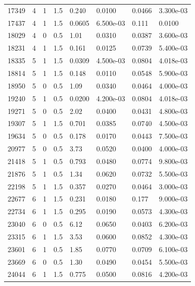 \documentclass[preview]{standalone}
\begin{document}
{{{\begin{tabular}{L{1.2cm}C{1.2cm} C{0.3cm}C{0.5cm} C{1.4cm}C{1.4cm} C{1.4cm}C{1.4cm}}
  17349  &     4  & 1     & 1.5 &  0.240  & 0.0100  & 0.0466 &  3.300e-03   \\ 
  17437  &     4  & 1     & 1.5 &  0.0605  & 6.500e-03  & 0.111 &  0.0100   \\ 
  18029  &     4  & 0     & 0.5 &  1.01  & 0.0310  & 0.0387 &  3.600e-03   \\ 
  18231  &     4  & 1     & 1.5 &  0.161  & 0.0125  & 0.0739 &  5.400e-03   \\ 
  18335  &     5  & 1     & 1.5 &  0.0309  & 4.500e-03  & 0.0804 &  4.018e-03   \\ 
  18814  &     5  & 1     & 1.5 &  0.148  & 0.0110  & 0.0548 &  5.900e-03   \\ 
  18950  &     5  & 0     & 0.5 &  1.09  & 0.0340  & 0.0464 &  4.000e-03   \\ 
  19240  &     5  & 1     & 0.5 &  0.0200  & 4.200e-03  & 0.0804 &  4.018e-03   \\ 
  19271  &     5  & 0     & 0.5 &  2.02  & 0.0400  & 0.0431 &  4.800e-03   \\ 
  19307  &     5  & 1     & 1.5 &  0.701  & 0.0385  & 0.0740 &  4.500e-03   \\ 
  19634  &     5  & 0     & 0.5 &  0.178  & 0.0170  & 0.0443 &  7.500e-03   \\ 
  20977  &     5  & 0     & 0.5 &  3.73  & 0.0520  & 0.0400 &  4.000e-03   \\ 
  21418  &     5  & 1     & 0.5 &  0.793  & 0.0480  & 0.0774 &  9.800e-03   \\ 
  21876  &     5  & 1     & 0.5 &  1.34  & 0.0620  & 0.0732 &  5.500e-03   \\ 
  22198  &     5  & 1     & 1.5 &  0.357  & 0.0270  & 0.0464 &  3.000e-03   \\ 
  22677  &     6  & 1     & 1.5 &  0.231  & 0.0180  & 0.177 &  9.000e-03   \\ 
  22734  &     6  & 1     & 1.5 &  0.295  & 0.0190  & 0.0573 &  4.300e-03   \\ 
  23040  &     6  & 0     & 0.5 &  6.12  & 0.0650  & 0.0403 &  6.200e-03   \\ 
  23315  &     6  & 1     & 1.5 &  3.53  & 0.0600  & 0.0852 &  4.300e-03   \\ 
  23601  &     6  & 1     & 0.5 &  1.85  & 0.0770  & 0.0709 &  6.100e-03   \\ 
  23669  &     6  & 0     & 0.5 &  1.30  & 0.0490  & 0.0454 &  5.500e-03   \\ 
  24044  &     6  & 1     & 1.5 &  0.775  & 0.0500  & 0.0816 &  4.200e-03   \\ 

\end{tabular}}}}
\end{document}
